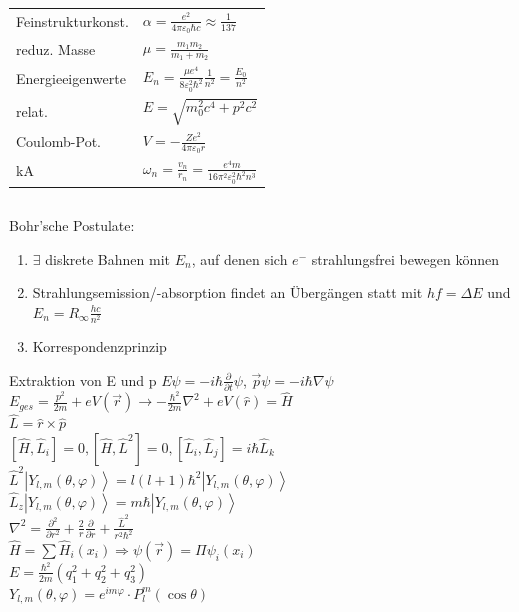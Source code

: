 \documentclass[12pt,a4paper]{article}
\newcommand{\pd}[2]{\frac{\partial #1}{\partial #2}}
\newcommand{\pdd}[2]{\frac{\partial^2 #1}{\partial #2^2}}
\newcommand{\ket}[1]{\left| #1 \right>}
\renewcommand{\=}[1]{\stackrel{#1}{=}}
\newcommand{\ort}{\vec r}
\theoremstyle{definition}
\theoremstyle{remark}
\begin{document}
\begin{center}
\begin{minipage}[t]{.35\linewidth}
\begin{tabular}{ll}
Feinstrukturkonst. &  $\alpha = \frac{e^2}{4\pi \varepsilon_0 \hbar c} \approx \frac{1}{137}$\\
reduz. Masse &  $\mu = \frac{m_1 m_2}{m_1 + m_2}$\\
Energieeigenwerte &  $E_n = \frac{\mu e^4}{8 \varepsilon_0^2 \hbar^2} \frac{1}{n^2} = \frac{E_0}{n^2}$\\
relat. & $E = \sqrt{m_0^2c^4 + p^2c^2}$\\
Coulomb-Pot. &  $V = - \frac{Ze^2}{4\pi \varepsilon_0 r}$\\
kA & $\omega_n = \frac{v_n}{r_n} = \frac{e^4 m}{16 \pi^2 \varepsilon_0^2 \hbar^2 n^3}$\\
\bottomrule
\end{tabular}
\end{minipage}%
\begin{minipage}[t]{.65\linewidth}
\vspace{0pt}
\begin{tabular}{ll}
\toprule

\end{tabular}
\end{minipage}
\end{center}



Bohr'sche Postulate:
\begin{enumerate}
\item $\exists$ diskrete Bahnen mit $E_n$, auf denen sich $e^-$ strahlungsfrei bewegen können
\item Strahlungsemission/-absorption findet an Übergängen statt mit $hf = \Delta E$ und $E_n = R_{\infty} \frac{hc}{n^2}$
\item Korrespondenzprinzip
\end{enumerate}

Extraktion von E und p \dotfill  $E \psi = -i\hbar \pd{}{t} \psi$, $\vec p \psi = - i \hbar \nabla \psi$\\
$E_{ges} = \frac{p^2}{2m} + eV(\ort) \rightarrow - \frac{\hbar^2}{2m}
\nabla^2 + eV(\hat r) = \hat H$\\
$\hat L = \hat r \times \hat p$\\
$[\hat H, \hat L_i] = 0, [\hat H, \hat L^2] = 0, [\hat L_i, \hat L_j] = i\hbar \hat L_k$\\
$\hat L^2 \ket{Y_{l,m} (\theta, \varphi)} = l(l+1)\hbar^2 \ket{Y_{l,m} (\theta, \varphi)}$\\
$\hat L_z \ket{Y_{l,m} (\theta, \varphi)} = m\hbar \ket{Y_{l,m} (\theta, \varphi)}$\\
$\nabla^2 = \pdd{}{r} + \frac{2}{r}\pd{}{r} + \frac{\hat L^2}{r^2 \hbar^2}$\\
$\hat H = \sum \hat H_i (x_i) \Rightarrow \psi(\ort) = \Pi \psi_i (x_i)$\\
$E = \frac{\hbar^2}{2m} (q_1^2 + q_2^2 + q_3^2)$\\
$Y_{l,m} (\theta, \varphi) = e^{im\varphi} \cdot P_l^m (\cos \theta)$\\
\end{document}
